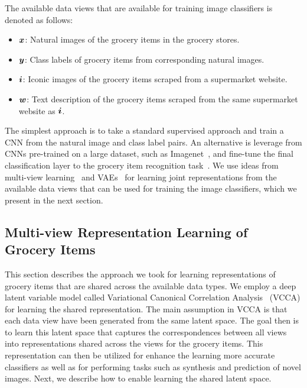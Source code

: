 The available data views that are available for training image classifiers is denoted as follows:
\begin{itemize}[itemsep=0em,topsep=1pt]
	\item ${\bm{x}}$: Natural images of the grocery items in the grocery stores.
	\item ${\bm{y}}$: Class labels of grocery items from corresponding natural images.
	\item ${\bm{i}}$: Iconic images of the grocery items scraped from a supermarket website.
	\item ${\bm{w}}$: Text description of the grocery items scraped from the same supermarket website as ${\bm{i}}$.
\end{itemize}
The simplest approach is to take a standard supervised approach and train a CNN from the natural image and class label pairs. An alternative is leverage from CNNs pre-trained on a large dataset, such as Imagenet~\cite{deng2009imagenet}, and fine-tune the final classification layer to the grocery item recognition task~\cite{sharif2014cnn}. We use ideas from multi-view learning~\cite{xu2013survey} and VAEs~\cite{kingma2013auto} for learning joint representations from the available data views that can be used for training the image classifiers, which we present in the next section.  


\subsection{Multi-view Representation Learning of Grocery Items}

This section describes the approach we took for learning representations of grocery items that are shared across the available data types. We employ a deep latent variable model called Variational Canonical Correlation Analysis~\cite{wang2016deep} (VCCA) for learning the shared representation. The main assumption in VCCA is that each data view have been generated from the same latent space. The goal then is to learn this latent space that captures the correspondences between all views into representations shared across the views for the grocery items. This representation can then be utilized for enhance the learning more accurate classifiers as well as for performing tasks such as synthesis and prediction of novel images. Next, we describe how to enable learning the shared latent space. 

